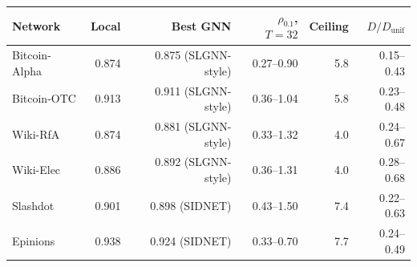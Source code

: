 \begin{tabular}{@{}lrrrrr@{}}
\toprule
Network & Local & Best GNN & $\rho_{0.1}$, $T{=}32$ & Ceiling & $D/D_{\mathrm{unif}}$ \\
\midrule
Bitcoin-Alpha & 0.874 & 0.875 (SLGNN-style) & 0.27--0.90 & 5.8 & 0.15--0.43 \\
Bitcoin-OTC & 0.913 & 0.911 (SLGNN-style) & 0.36--1.04 & 5.8 & 0.23--0.48 \\
Wiki-RfA & 0.874 & 0.881 (SLGNN-style) & 0.33--1.32 & 4.0 & 0.24--0.67 \\
Wiki-Elec & 0.886 & 0.892 (SLGNN-style) & 0.36--1.31 & 4.0 & 0.28--0.68 \\
Slashdot & 0.901 & 0.898 (SIDNET) & 0.43--1.50 & 7.4 & 0.22--0.63 \\
Epinions & 0.938 & 0.924 (SIDNET) & 0.33--0.70 & 7.7 & 0.24--0.49 \\
\bottomrule
\end{tabular}
